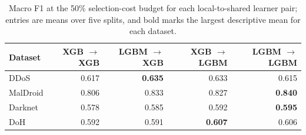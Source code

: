 \begin{table}[t]
    \centering
    \caption{Macro F1 at the 50\% selection-cost budget for each local-to-shared learner pair; entries are means over five splits, and bold marks the largest descriptive mean for each dataset.}
    \label{tab:eval-architecture}
    \footnotesize
    \setlength{\tabcolsep}{2.8pt}
    \begin{tabular}{@{}lrrrr@{}}
        \toprule
        Dataset & \makecell{XGB\\$\to$XGB} & \makecell{LGBM\\$\to$XGB} & \makecell{XGB\\$\to$LGBM} & \makecell{LGBM\\$\to$LGBM} \\
        \midrule
        DDoS & 0.617 & \textbf{0.635} & 0.633 & 0.615 \\
        MalDroid & 0.806 & 0.833 & 0.827 & \textbf{0.840} \\
        Darknet & 0.578 & 0.585 & 0.592 & \textbf{0.595} \\
        DoH & 0.592 & 0.591 & \textbf{0.607} & 0.606 \\
        \bottomrule
    \end{tabular}
\end{table}
